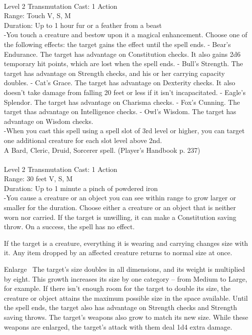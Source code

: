 \documentclass[10pt,twocolumn]{report}
\begin{document}
 \\
Level 2 \quad Transmutation \quad Cast: 1 Action\\
Range: Touch \quad V, S, M\\
Duration: Up to 1 hour \quad fur or a feather from a beast\\
-You touch a creature and bestow upon it a magical enhancement. Choose one of the following effects: the target gains the effect until the spell ends.
- Bear’s Endurance. The target has advantage on Constitution checks. It also gains 2d6 temporary hit points, which are lost when the spell ends.
- Bull’s Strength. The target has advantage on Strength checks, and his or her carrying capacity doubles.
- Cat’s Grace. The target has advantage on Dexterity checks. It also doesn’t take damage from falling 20 feet or less if it isn’t incapacitated.
- Eagle’s Splendor. The target has advantage on Charisma checks.
- Fox’s Cunning. The target thas advantage on Intelligence checks.
- Owl’s Wisdom. The target has advantage on Wisdom checks.\\
-When you cast this spell using a spell slot of 3rd level or higher, you can target one additional creature for each slot level above 2nd.\\
A Bard, Cleric, Druid, Sorcerer spell. (Player's Handbook p. 237) \\


 \\
Level 2 \quad Transmutation \quad Cast: 1 Action\\
Range: 30 feet \quad V, S, M\\
Duration: Up to 1 minute \quad a pinch of powdered iron\\
-You cause a creature or an object you can see within range to grow larger or smaller for the duration. Choose either a creature or an object that is neither worn nor carried. If the target is unwilling, it can make a Constitution saving throw. On a success, the spell has no effect. 

If the target is a creature, everything it is wearing and carrying changes size with it. Any item dropped by an affected creature returns to normal size at once. 

Enlarge 
The target’s size doubles in all dimensions, and its weight is multiplied by eight. This growth increases its size by one category – from Medium to Large, for example. If there isn’t enough room for the target to double its size, the creature or object attains the maximum possible size in the space available. Until the spell ends, the target also has advantage on Strength checks and Strength saving throws. The target’s weapons also grow to match its new size. While these weapons are enlarged, the target’s attack with them deal 1d4 extra damage. 
\end{document}
